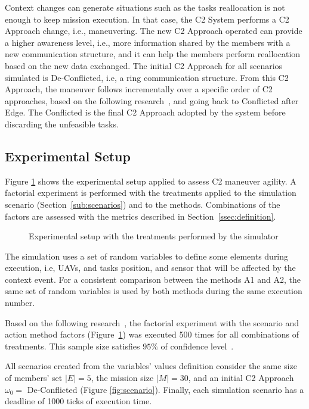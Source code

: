 Context changes can generate situations such as the tasks reallocation is not enough to keep mission execution. In that case, the C2 System performs a C2 Approach change, i.e., maneuvering. The new C2 Approach operated can provide a higher awareness level, i.e., more information shared by the members with a new communication structure, and it can help the members perform reallocation based on the new data exchanged. The initial C2 Approach for all scenarios simulated is De-Conflicted, i.e, a ring communication structure. From this C2 Approach, the maneuver follows incrementally over a specific order of C2 approaches, based on the following research~\cite{france2014}, and going back to Conflicted after Edge. The Conflicted is the final C2 Approach adopted by the system before discarding the unfeasible tasks.

\subsection{Experimental Setup}
\label{sub:setup}

Figure \ref{fig:exp_setup} shows the experimental setup applied to assess C2 maneuver agility. A factorial experiment is performed with the treatments applied to the simulation scenario (Section~\ref{sub:scenarios}) and to the methods. Combinations of the factors are assessed with the metrics described in Section~\ref{ssec:definition}.

\begin{figure}[ht!]
    \centering
    \scalebox{.65}{}
    \caption{Experimental setup with the treatments performed by the simulator}
    \label{fig:exp_setup}
\end{figure}

The simulation uses a set of random variables to define some elements during execution, i.e, UAVs, and tasks position, and sensor that will be affected by the context event. For a consistent comparison between the methods A1 and A2, the same set of random variables is used by both methods during the same execution number.

Based on the following research~\cite{CochranW.G.1983}, the factorial experiment with the scenario and action method factors (Figure~\ref{fig:exp_setup}) was executed 500 times for all combinations of treatments. This sample size satisfies $95\%$ of confidence level~\cite{CochranW.G.1983}.

All scenarios created from the variables' values definition consider the same size of members' set $|E|=5$, the mission size $|M|=30$, and an initial C2 Approach $\omega_0 =$ De-Conflicted (Figure \ref{fig:scenario}). Finally, each simulation scenario has a deadline of 1000 ticks of execution time.

